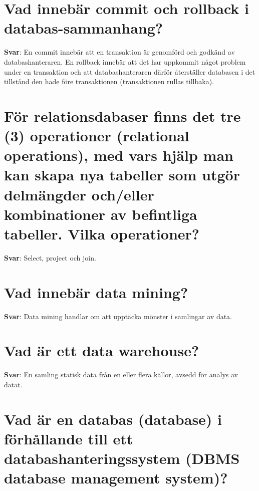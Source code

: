 \documentclass[a4paper,11pt,oneside]{book}
\begin{document}
\begin{sloppypar}
\section{Vad inneb\"ar commit och rollback i databas-sammanhang?}

\label{q:278:sa:sv:True}

\textbf{Svar}: En commit inneb\"ar att en transaktion \"ar genomf\"ord och godk\"and av databashanteraren. En rollback inneb\"ar att det har uppkommit n\r{a}got problem under en transaktion och att databashanteraren d\"arf\"or \r{a}terst\"aller databasen i det tillst\r{a}nd den hade f\"ore transaktionen (transaktionen rullas tillbaka).



\section{F\"or relationsdabaser finns det tre (3) operationer (relational operations), med vars hj\"alp man kan skapa nya tabeller som utg\"or delm\"angder och/eller kombinationer av befintliga tabeller. Vilka operationer?}

\label{q:279:sa:sv:True}

\textbf{Svar}: Select, project och join.



\section{Vad inneb\"ar data mining?}

\label{q:280:sa:sv:True}

\textbf{Svar}: Data mining handlar om att uppt\"acka m\"onster i samlingar av data.



\section{Vad \"ar ett data warehouse?}

\label{q:281:sa:sv:True}

\textbf{Svar}: En samling statisk data fr\r{a}n en eller flera k\"allor, avsedd f\"or analys av datat.



\section{Vad \"ar en databas (database) i f\"orh\r{a}llande till ett databashanteringssystem (DBMS {\textendash} database management system)?}


\end{sloppypar}
\end{document}
